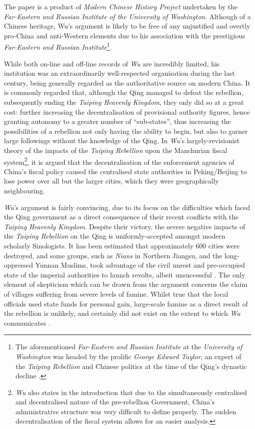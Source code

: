 \documentclass[a4paper,oneside]{article}
\begin{document}

The paper is a product of \textit{Modern Chinese History Project} undertaken by
the \textit{Far-Eastern and Russian Institute of the University of Washington}.
Although of a Chinese heritage, Wu's argument is likely to be free of any
unjustified and overtly pro-China and anti-Western elements due to his
association with the prestigious \textit{Far-Eastern and Russian
Institute}\footnote{The aforementioned \textit{Far-Eastern and Russian
Institute} at the \textit{University of Washington} was headed by the prolific
\textit{George Edward Taylor}, an expert of the \textit{Taiping Rebellion} and
Chinese politics at the time of the Qing's dynastic decline
\autocite{Taylor:1999}.}.

While both on-line and off-line records of \textit{Wu} are incredibly limited,
his institution was an extraordinarily well-respected organisation during the
last century, being generally regarded as the authoritative source on modern
China. It is commonly regarded that, although the Qing managed to defeat the
rebellion, subsequently ending the \textit{Taiping Heavenly Kingdom}, they only
did so at a great cost: further increasing the decentralisation of provisional
authority figures, hence granting autonomy to a greater number of
``sub-states'', thus increasing the possibilities of a rebellion not only having
the ability to begin, but also to garner large followings without the knowledge
of the Qing. In \textit{Wu}'s largely-revisionist theory of the impacts of the
\textit{Taiping Rebellion} upon the Manchurian fiscal
system\footnote{\textit{Wu} also states in the introduction that due to the
simultaneously centralised and decentralised nature of the pre-rebellion
Government, China's administrative structure was very difficult to define
properly. The sudden decentralisation of the fiscal system allows for an easier
analysis.}, it is argued that the decentralisation of the enforcement agencies
of China's fiscal policy caused the centralised state authorities in
Peking/Beijing to lose power over all but the larger cities, which they were
geographically neighbouring.

\textit{Wu}'s argument is fairly convincing, due to its focus on the
difficulties which faced the Qing government as a direct consequence of their
recent conflicts with the \textit{Taiping Heavenly Kingdom}. Despite their
victory, the severe negative impacts of the \textit{Taiping Rebellion} on the
Qing is uniformly-accepted amongst modern scholarly Sinologists. It has been
estimated that approximately 600 cities were destroyed, and some groups, such as
\textit{Nians} in Northern Jiangsu, and the long-oppressed Yunnan Muslims, took
advantage of the civil unrest and pre-occupied state of the imperial authorities
to launch revolts, albeit unsuccessful \autocite{Tucker:2017}. The only element
of skepticism which can be drawn from the argument concerns the claim of
villages suffering from severe levels of famine. Whilst true that the local
officials used state funds for personal gain, large-scale famine as a direct
result of the rebellion is unlikely, and certainly did not exist on the extent
to which \textit{Wu} communicates \autocite{Grada:2009}.
\end{document}

